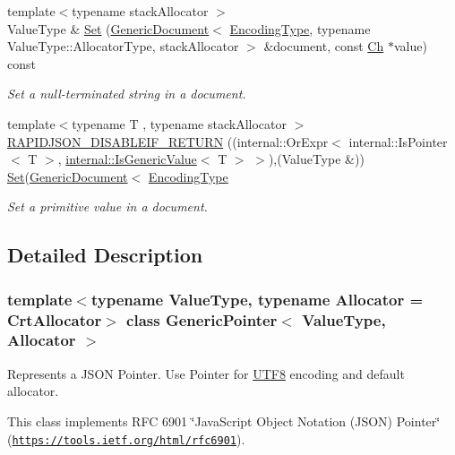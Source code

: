 \begin{DoxyCompactItemize}
{\footnotesize template$<$typename stack\+Allocator $>$ }\\Value\+Type \& \hyperlink{class_generic_pointer_abaa0cda4ed84a4435871d355279bab8e}{Set} (\hyperlink{class_generic_document}{Generic\+Document}$<$ \hyperlink{class_generic_pointer_a4b802da797a7a0b615fd9611cedb7c3b}{Encoding\+Type}, typename Value\+Type\+::\+Allocator\+Type, stack\+Allocator $>$ \&document, const \hyperlink{class_generic_pointer_ab292356c11b4015c98d21b966b11f285}{Ch} $\ast$value) const
\begin{DoxyCompactList}\small\item\em Set a null-\/terminated string in a document. \end{DoxyCompactList}\item 
{\footnotesize template$<$typename T , typename stack\+Allocator $>$ }\\\hyperlink{class_generic_pointer_a1bb4a253f33687734e5b20795632a801}{R\+A\+P\+I\+D\+J\+S\+O\+N\+\_\+\+D\+I\+S\+A\+B\+L\+E\+I\+F\+\_\+\+R\+E\+T\+U\+RN} ((internal\+::\+Or\+Expr$<$ internal\+::\+Is\+Pointer$<$ T $>$, \hyperlink{structinternal_1_1_is_generic_value}{internal\+::\+Is\+Generic\+Value}$<$ T $>$ $>$),(Value\+Type \&)) \hyperlink{class_generic_pointer_a71476d125a276b62a246990da1bd3468}{Set}(\hyperlink{class_generic_document}{Generic\+Document}$<$ \hyperlink{class_generic_pointer_a4b802da797a7a0b615fd9611cedb7c3b}{Encoding\+Type}
\begin{DoxyCompactList}\small\item\em Set a primitive value in a document. \end{DoxyCompactList}\end{DoxyCompactItemize}


\subsection{Detailed Description}
\subsubsection*{template$<$typename Value\+Type, typename Allocator = Crt\+Allocator$>$\newline
class Generic\+Pointer$<$ Value\+Type, Allocator $>$}

Represents a J\+S\+ON Pointer. Use Pointer for \hyperlink{struct_u_t_f8}{U\+T\+F8} encoding and default allocator. 

This class implements R\+FC 6901 \char`\"{}\+Java\+Script Object Notation (\+J\+S\+O\+N) Pointer\char`\"{} (\href{https://tools.ietf.org/html/rfc6901}{\tt https\+://tools.\+ietf.\+org/html/rfc6901}).

